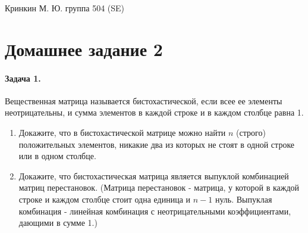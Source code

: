 \documentclass[a4paper,12pt]{article}
\begin{document}
\lstset{
	basicstyle=\small,
	stringstyle=\ttfamily,
	showstringspaces=false,
	columns=fixed,
	breaklines=true,
	numbers=right,
	numberstyle=\tiny
}

\newtheorem{Def}{Определение}[section]
\newtheorem{Th}{Теорема}
\newtheorem{Lem}[Th]{Лемма}
\newenvironment{Proof}
	{\par\noindent{\bf Доказательство.}}
	{\hfill$\scriptstyle\blacksquare$}
\newenvironment{Solution}
	{\par\noindent{\bf Решение.}}
	{\hfill$\scriptstyle\blacksquare$}


\begin{flushright}
	Кринкин М. Ю. группа 504 (SE)
\end{flushright}

\section{Домашнее задание 2}

\paragraph{Задача 1.} Вещественная матрица называется бистохастической, если всее ее элементы неотрицательны, и сумма элементов в каждой строке и в каждом столбце равна 1.
\begin{enumerate}
\item Докажите, что в бистохастической матрице можно найти $n$ (строго) положительных элементов, никакие два из которых не стоят в одной строке или в одном столбце.

\item Докажите, что бистохастическая матрица является выпуклой комбинацией матриц перестановок. (Матрица перестановок - матрица, у которой в каждой строке и каждом столбце стоит одна единица и $n-1$ нуль. Выпуклая комбинация - линейная комбинация с неотрицательными коэффициентами, дающими в сумме 1.)
\end{enumerate}
\end{document}
